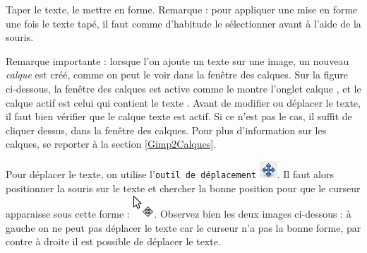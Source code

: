 Taper le texte, le mettre en forme. Remarque : pour appliquer une mise en forme une fois le texte tapé, il faut comme d'habitude le sélectionner avant à l'aide de la souris.


Remarque importante\label{remarqueCalque} : lorsque l'on ajoute un texte sur une image, un nouveau \emph{calque} est créé, comme on peut le voir dans la fenêtre des calques. Sur la figure ci-dessous, la fenêtre des calques est active comme le montre l'onglet calque , et le calque actif est celui qui contient le texte . Avant de modifier ou déplacer le texte, il faut bien vérifier que le calque texte est actif. Si ce n'est pas le cas, il suffit de cliquer dessus, dans la fenêtre des calques. Pour plus d'information sur les calques, se reporter à la section \vref{Gimp2Calques}. 


Pour déplacer le texte, on utilise l'\texttt{outil de déplacement} \includegraphics[width=.6cm]{./images/image02/iconeDeplace}. Il faut alors positionner la souris sur le texte et chercher la bonne position pour que le curseur apparaisse sous cette forme : \includegraphics[width=.6cm]{./images/image02/iconeTexteBouge}. Observez bien les deux images ci-dessous : à gauche on ne peut pas déplacer le texte car le curseur n'a pas la bonne forme, par contre à droite il est possible de déplacer le texte.


